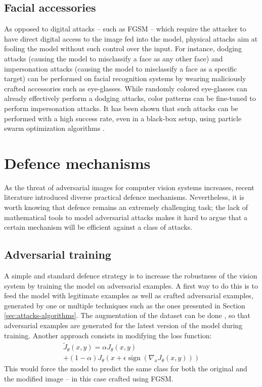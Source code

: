 \documentclass[twocolumn]{../../cs-classes/cs-classes}
\DeclareMathOperator*{\sign}{sign}
\begin{document}
\subsection{Facial accessories}
As opposed to digital attacks -- such as FGSM -- which require the attacker to have direct digital access to the image fed into the model, physical attacks aim at fooling the model without such control over the input. For instance, dodging attacks (causing the model to misclassify a face as any other face) and impersonation attacks (causing the model to misclassify a face as a specific target) can be performed on facial recognition systems by wearing maliciously crafted accessories such as eye-glasses. While randomly colored eye-glasses can already effectively perform a dodging attacks, color patterns can be fine-tuned to perform impersonation attacks. It has been shown that such attacks can be performed with a high success rate, even in a black-box setup, using particle swarm optimization algorithms \cite{sharif2016accessorize}.

\section{Defence mechanisms}
As the threat of adversarial images for computer vision systems increases, recent literature introduced diverse practical defence mechanisms. Nevertheless, it is worth knowing that defence remains an extremely challenging task; the lack of mathematical tools to model adversarial attacks makes it hard to argue that a certain mechanism will be efficient against a class of attacks.

\subsection{Adversarial training}
A simple and standard defence strategy is to increase the robustness of the vision system by training the model on adversarial examples. A first way to do this is to feed the model with legitimate examples as well as crafted adversarial examples, generated by one or multiple techniques such as the ones presented in Section \ref{sec:attacks-algorithms}. The augmentation of the dataset can be done , so that adversarial examples are generated for the latest version of the model during training. Another approach \cite{goodfellow2014explaining} consists in modifying the loss function:
\begin{multline*}
    \tilde{J}_\theta(x, y) = \alpha J_\theta(x, y) \\+ (1-\alpha)J_\theta\left(x+\epsilon\sign\left(\nabla_x J_\theta(x, y)\right)\right)
\end{multline*}
This would force the model to predict the same class for both the original and the modified image -- in this case crafted using FGSM.
\end{document}
